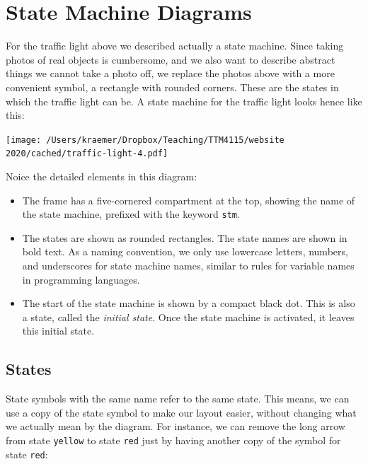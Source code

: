 \documentclass[10pt, twoside, twocolumn]{book}
\providecommand{\tightlist}{%
  \setlength{\itemsep}{0pt}\setlength{\parskip}{0pt}}
\let\origfigure=\figure
\let\endorigfigure=\endfigure
\renewenvironment{figure}[1][]{%
  \origfigure[H]
}{%
  \endorigfigure
}
\begin{document}
\hypertarget{state-machine-diagrams}{%
\section{State Machine Diagrams}\label{state-machine-diagrams}}

For the traffic light above we described actually a state machine. Since
taking photos of real objects is cumbersome, and we also want to
describe abstract things we cannot take a photo off, we replace the
photos above with a more convenient symbol, a rectangle with rounded
corners. These are the states in which the traffic light can be. A state
machine for the traffic light looks hence like this:

\begin{figure}[htbp]
\begin{center}
\texttt{[image: /Users/kraemer/Dropbox/Teaching/TTM4115/website 2020/cached/traffic-light-4.pdf]}%
\label{default}
\end{center}
\end{figure}
Noice the detailed elements in this diagram:

\begin{itemize}
\tightlist
\item
  The frame has a five-cornered compartment at the top, showing the name
  of the state machine, prefixed with the keyword \texttt{stm}.
\item
  The states are shown as rounded rectangles. The state names are shown
  in bold text. As a naming convention, we only use lowercase letters,
  numbers, and underscores for state machine names, similar to rules for
  variable names in programming languages.
\item
  The start of the state machine is shown by a compact black dot. This
  is also a state, called the \emph{initial state}. Once the state
  machine is activated, it leaves this initial state.
\end{itemize}

\hypertarget{states}{%
\subsection{States}\label{states}}

State symbols with the same name refer to the same state. This means, we
can use a copy of the state symbol to make our layout easier, without
changing what we actually mean by the diagram. For instance, we can
remove the long arrow from state \texttt{yellow} to state \texttt{red}
just by having another copy of the symbol for state \texttt{red}:
\end{document}
